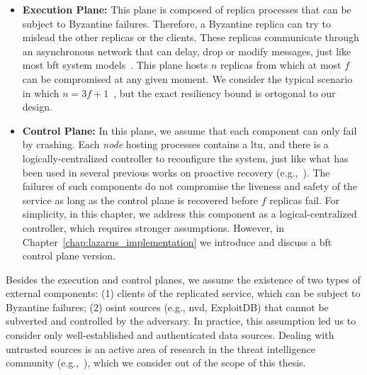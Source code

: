 \begin{itemize}

\item \textbf{Execution Plane:} 
This plane is composed of replica processes that can be subject to Byzantine failures.
Therefore, a Byzantine replica can try to mislead the other replicas or the clients.
These replicas communicate through an asynchronous network that can delay, drop or modify messages, just like most \gls{bft} system models~\cite{Castro:2002,Kotla:2010,Bessani:2014,Aublin:2015}.
This plane hosts $n$ replicas from which at most $f$ can be compromised at any given moment.
We consider the typical scenario in which $n=3f+1$~\cite{Castro:2002,Kotla:2010,Moniz:2011,Bessani:2014,Aublin:2015}, but the exact resiliency bound is ortogonal to our design.

\item \textbf{Control Plane:}  
In this plane, we assume that each component can only fail by crashing. 
Each \emph{node} hosting processes contains a \gls{ltu}, and there is a logically-centralized controller to reconfigure the system, just like what has been used in several previous works on proactive recovery (e.g.,~\cite{Roeder:2010,Platania:2014,Sousa:2010}).
The failures of such components do not compromise the liveness and safety of the service as long as the control plane is recovered before $f$ replicas fail.
For simplicity, in this chapter, we address this component as a logical-centralized controller, which requires stronger assumptions. 
However, in Chapter~\ref{chap:lazarus_implementation} we introduce and discuss a \gls{bft} control plane version.


\end{itemize}

Besides the execution and control planes, we assume the existence of two types of external components: (1) clients of the replicated service, which can be subject to Byzantine failures; (2) \gls{osint} sources (e.g., \gls{nvd}, ExploitDB) that cannot be subverted and controlled by the adversary.
In practice, this assumption led us to consider only well-established and authenticated data sources.
Dealing with untrusted sources is an active area of research in the threat intelligence community (e.g.,~\cite{Sabottke:2015,Liu:2015}), which we consider out of the scope of this thesis.



